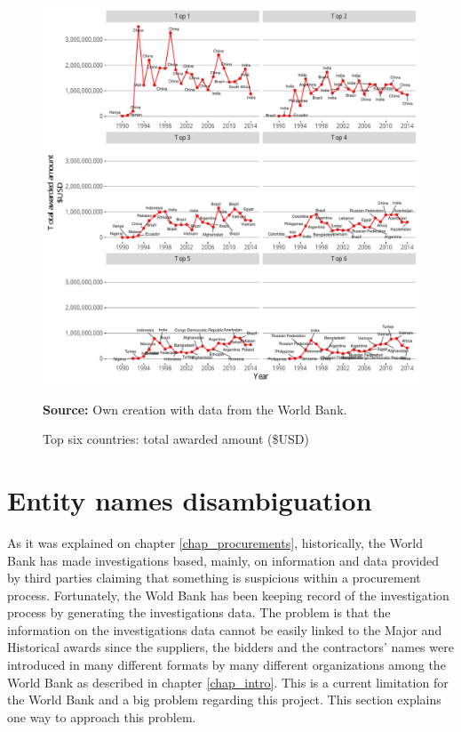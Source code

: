 \begin{figure}[H]
\begin{center}
\caption{Top six countries: total awarded amount (\$USD)}
\label{fig_major_awarded_usd_top}
\includegraphics[max width=1\textwidth]{../img/major_historic_top_usd_awarded.pdf}
\end{center}
\noindent \footnotesize{\textbf{Source:} Own creation with data from the World Bank.}
\end{figure}

\newpage


\section{Entity names disambiguation}

As it was explained on chapter \ref{chap_procurements}, historically, the World Bank has made investigations based, mainly, on information and data provided by third parties claiming that something is suspicious within a procurement process. Fortunately, the Wold Bank has been keeping record of the investigation process by generating the investigations data. The problem is that the information on the investigations data cannot be easily linked to the Major and Historical awards since the suppliers, the bidders and the contractors' names were introduced in many different formats by many different organizations among the World Bank as described in chapter \ref{chap_intro}. This is a current limitation for the World Bank and a big problem regarding this project. This section explains one way to approach this problem.


